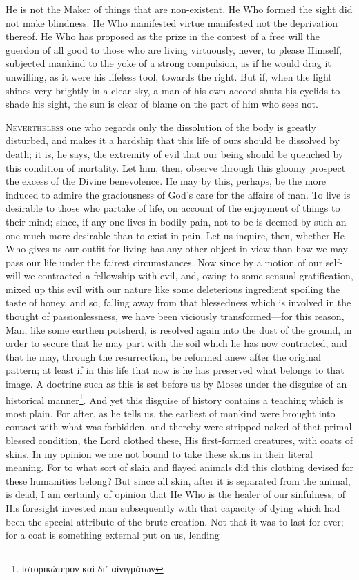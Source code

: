 He is not the Maker of things that are non-existent. He Who formed the sight did not make blindness. He Who manifested virtue manifested not the deprivation thereof. He Who has proposed as the prize in the contest of a free will the guerdon of all good to those who are living virtuously, never, to please Himself, subjected mankind to the yoke of a strong compulsion, as if he would drag it unwilling, as it were his lifeless tool, towards the right. But if, when the light shines very brightly in a clear sky, a man of his own accord shuts his eyelids to shade his sight, the sun is clear of blame on the part of him who sees not.


\textsc{Nevertheless} one who regards only the dissolution of the body is greatly disturbed, and makes it a hardship that this life of ours should be dissolved by death; it is, he says, the extremity of evil that our being should be quenched by this condition of mortality. Let him, then, observe through this gloomy prospect the excess of the Divine benevolence. He may by this, perhaps, be the more induced to admire the graciousness of God’s care for the affairs of man. To live is desirable to those who partake of life, on account of the enjoyment of things to their mind; since, if any one lives in bodily pain, not to be is deemed by such an one much more desirable than to exist in pain. Let us inquire, then, whether He Who gives us our outfit for living has any other object in view than how we may pass our life under the fairest circumstances. Now since by a motion of our self-will we contracted a fellowship with evil, and, owing to some sensual gratification, mixed up this evil with our nature like some deleterious ingredient spoiling the taste of honey, and so, falling away from that blessedness which is involved in the thought of passionlessness, we have been viciously transformed—for this reason, Man, like some earthen potsherd, is resolved again into the dust of the ground, in order to secure that he may part with the soil which he has now contracted, and that he may, through the resurrection, be reformed anew after the original pattern; at least if in this life that now is he has preserved what belongs to that image. A doctrine such as this is set before us by Moses under the disguise of an historical manner\footnote{\textgreek{ἱστορικώτερον καὶ δι᾽ αἰνιγμάτων}}. And yet this disguise of history contains a teaching which is most plain. For after, as he tells us, the earliest of mankind were brought into contact with what was forbidden, and thereby were stripped naked of that primal blessed condition, the Lord clothed these, His first-formed creatures, with coats of skins. In my opinion we are not bound to take these skins in their literal meaning. For to what sort of slain and flayed animals did this clothing devised for these humanities belong? But since all skin, after it is separated from the animal, is dead, I am certainly of opinion that He Who is the healer of our sinfulness, of His foresight invested man subsequently with that capacity of dying which had been the special attribute of the brute creation. Not that it was to last for ever; for a coat is something external put on us, lending 